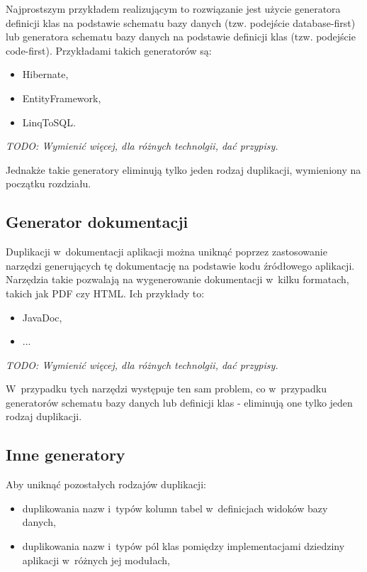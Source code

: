 Najprostszym przykładem realizującym to rozwiązanie jest użycie generatora definicji klas na podstawie schematu bazy danych (tzw. podejście database-first) lub generatora schematu bazy danych na podstawie definicji klas (tzw. podejście code-first).
Przykładami takich generatorów są:

\begin{itemize}
 \item Hibernate,
 \item EntityFramework,
 \item LinqToSQL.
\end{itemize}

\emph{TODO: Wymienić więcej, dla różnych technolgii, dać przypisy.}

Jednakże takie generatory eliminują tylko jeden rodzaj duplikacji, wymieniony na początku rozdziału.


\subsection{Generator dokumentacji}

Duplikacji w~dokumentacji aplikacji można uniknąć poprzez zastosowanie narzędzi generujących tę dokumentację na podstawie kodu źródłowego aplikacji.
Narzędzia takie pozwalają na wygenerowanie dokumentacji w~kilku formatach, takich jak PDF czy HTML.
Ich przykłady to:

\begin{itemize}
 \item JavaDoc,
 \item ...
\end{itemize}

\emph{TODO: Wymienić więcej, dla różnych technolgii, dać przypisy.}

W~przypadku tych narzędzi występuje ten sam problem, co w~przypadku generatorów schematu bazy danych lub definicji klas - eliminują one tylko jeden rodzaj duplikacji.


\subsection{Inne generatory}

Aby uniknąć pozostałych rodzajów duplikacji:

\begin{itemize}
 \item duplikowania nazw i~typów kolumn tabel w~definicjach widoków bazy danych,
 \item duplikowania nazw i~typów pól klas pomiędzy implementacjami dziedziny aplikacji w~różnych jej modułach,
\end{itemize}

